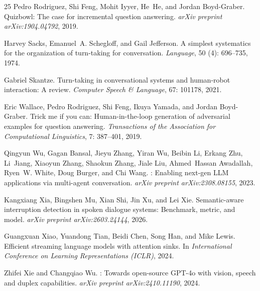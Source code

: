 \documentclass{article}
\begin{document}
\begin{thebibliography}{25}
Pedro Rodriguez, Shi Feng, Mohit Iyyer, He~He, and Jordan Boyd-Graber.
\newblock Quizbowl: The case for incremental question answering.
\newblock \emph{arXiv preprint arXiv:1904.04792}, 2019.

Harvey Sacks, Emanuel~A. Schegloff, and Gail Jefferson.
\newblock A simplest systematics for the organization of turn-taking for conversation.
\newblock \emph{Language}, 50 (4): 696--735, 1974.

Gabriel Skantze.
\newblock Turn-taking in conversational systems and human-robot interaction: A review.
\newblock \emph{Computer Speech \& Language}, 67: 101178, 2021.

Eric Wallace, Pedro Rodriguez, Shi Feng, Ikuya Yamada, and Jordan Boyd-Graber.
\newblock Trick me if you can: Human-in-the-loop generation of adversarial examples for question answering.
\newblock \emph{Transactions of the Association for Computational Linguistics}, 7: 387--401, 2019.

Qingyun Wu, Gagan Bansal, Jieyu Zhang, Yiran Wu, Beibin Li, Erkang Zhu, Li~Jiang, Xiaoyun Zhang, Shaokun Zhang, Jiale Liu, Ahmed~Hassan Awadallah, Ryen~W. White, Doug Burger, and Chi Wang.
: Enabling next-gen {LLM} applications via multi-agent conversation.
\newblock \emph{arXiv preprint arXiv:2308.08155}, 2023.

Kangxiang Xia, Bingshen Mu, Xian Shi, Jin Xu, and Lei Xie.
\newblock Semantic-aware interruption detection in spoken dialogue systems: Benchmark, metric, and model.
\newblock \emph{arXiv preprint arXiv:2603.24144}, 2026.

Guangxuan Xiao, Yuandong Tian, Beidi Chen, Song Han, and Mike Lewis.
\newblock Efficient streaming language models with attention sinks.
\newblock In \emph{International Conference on Learning Representations (ICLR)}, 2024.

Zhifei Xie and Changqiao Wu.
: Towards open-source {GPT-4o} with vision, speech and duplex capabilities.
\newblock \emph{arXiv preprint arXiv:2410.11190}, 2024.


\end{thebibliography}
\end{document}
